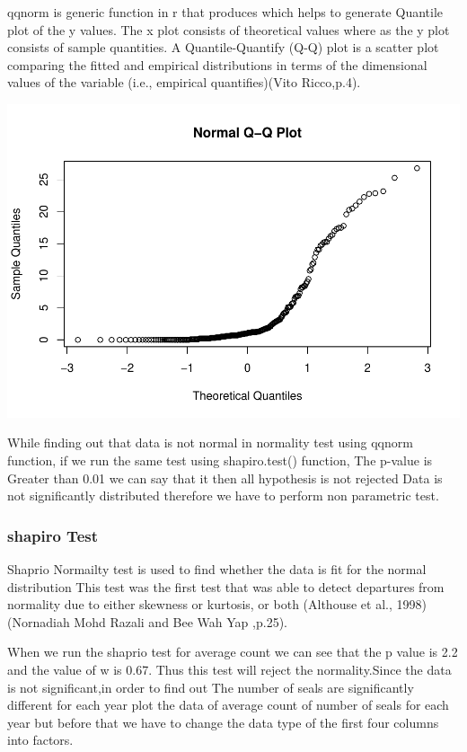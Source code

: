 \documentclass[
]{article}
\begin{document}
qqnorm is generic function in r that produces which helps to generate
Quantile plot of the y values. The x plot consists of theoretical values
where as the y plot consists of sample quantities. A Quantile-Quantify
(Q-Q) plot is a scatter plot comparing the fitted and empirical
distributions in terms of the dimensional values of the variable (i.e.,
empirical quantifies)(Vito Ricco,p.4).

\includegraphics{Statistical-analysis-in-RStudio_files/figure-latex/unnamed-chunk-4-1.pdf}

While finding out that data is not normal in normality test using qqnorm
function, if we run the same test using shapiro.test() function, The
p-value is Greater than 0.01 we can say that it then all hypothesis is
not rejected Data is not significantly distributed therefore we have to
perform non parametric test.

\hypertarget{shapiro-test}{%
\subsubsection{shapiro Test}\label{shapiro-test}}

Shaprio Normailty test is used to find whether the data is fit for the
normal distribution This test was the first test that was able to detect
departures from normality due to either skewness or kurtosis, or both
(Althouse et al., 1998)(Nornadiah Mohd Razali and Bee Wah Yap ,p.25).

When we run the shaprio test for average count we can see that the p
value is 2.2 and the value of w is 0.67. Thus this test will reject the
normality.Since the data is not significant,in order to find out The
number of seals are significantly different for each year plot the data
of average count of number of seals for each year but before that we
have to change the data type of the first four columns into factors.
\end{document}
